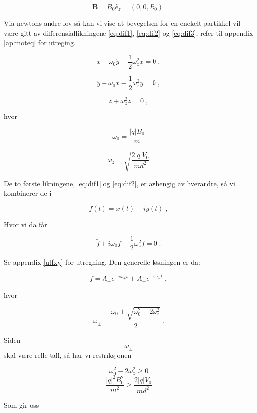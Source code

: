\documentclass[reprint,english,notitlepage, nofootinbib]{revtex4-1}  %
\begin{document}
\begin{equation}\label{B}
\mathbf{B} = B_0\hat{e}_z = \left ( 0, 0, B_0 \right ) \;
\end{equation}

Via newtons andre lov så kan vi vise at bevegelsen for en enekelt partikkel vil være gitt av differensiallikningene \eqref{eq:dif1}, \eqref{eq:dif2} og \eqref{eq:dif3}, refer til appendix \ref{ap:moteq} for utreging. 

\begin{equation} \label{eq:dif1}
\ddot{x} - \omega_0 \dot{y} - \frac{1}{2}\omega_z^2 x = 0 \; ,
\end{equation}

\begin{equation}\label{eq:dif2}
\ddot{y} + \omega_0 \dot{x} - \frac{1}{2}\omega_z^2 y = 0 \; ,
\end{equation}

\begin{equation}\label{eq:dif3}
\ddot{z} + \omega_z^2 z = 0 \; ,
\end{equation}

hvor


$$\omega_0 = \frac{|q|B_0}{m}$$

$$ \omega_z = \sqrt{\frac{2|q|V_0}{md^2}}$$

De to første likningene, \eqref{eq:dif1} og \eqref{eq:dif2}, er avhengig av hverandre, så vi kombinerer de i

$$
f(t) = x(t) + iy(t) \; ,
$$

Hvor vi da får 

\begin{equation}\label{fxy}
\ddot{f} + i\omega_0 \dot{f} - \frac{1}{2} \omega_z^2 f = 0 \; .
\end{equation}

Se appendix \ref{utfxy} for utregning. Den generelle løsningen er da:

\begin{equation}\label{fsolve}
f = A_+e^{-i\omega_+t} + A_-e^{-i\omega_-t} \; ,
\end{equation}

hvor

$$\omega_{\pm} = \frac{\omega_0 \pm \sqrt{\omega_0^2-2\omega_z^2}}{2} \; .$$

Siden $$\omega_{\pm}$$ skal være relle tall, så har vi restriksjonen

$$\omega_0^2-2\omega_z^2 \geq 0$$
$$\frac{|q|^2B_0^2}{m^2} \geq \frac{2|q|V_0}{md^2}$$

Som gir oss
\end{document}
